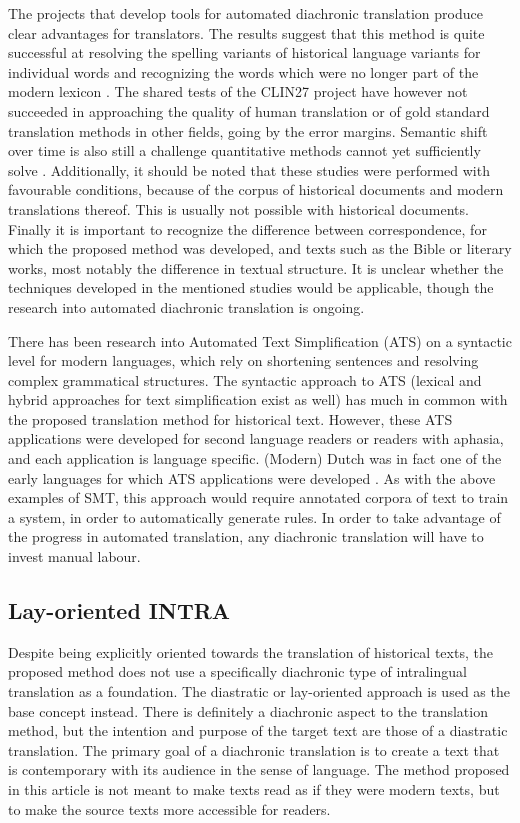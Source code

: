 \begin{paper}
The projects that develop tools for automated diachronic translation
produce clear advantages for translators. The results suggest that this
method is quite successful at resolving the spelling variants of
historical language variants for individual words and recognizing the
words which were no longer part of the modern lexicon \citep[303]{domingo_historical_2017}. The shared tests of the CLIN27 project have however not succeeded
in approaching the quality of human translation or of gold standard
translation methods in other fields, going by the error margins.
Semantic shift over time is also still a challenge quantitative methods
cannot yet sufficiently solve \citep[60]{tjong_kim_sang_clin27_2017}. Additionally,
it should be noted that these studies were performed with favourable
conditions, because of the corpus of historical documents and modern
translations thereof. This is usually not possible with historical
documents. Finally it is important to recognize the difference between
correspondence, for which the proposed method was developed, and texts
such as the Bible or literary works, most notably the difference in
textual structure. It is unclear whether the techniques developed in the
mentioned studies would be applicable, though the research into
automated diachronic translation is ongoing.

There has been research into Automated Text Simplification (ATS) on a
syntactic level for modern languages, which rely on shortening sentences
and resolving complex grammatical structures. The syntactic approach to
ATS (lexical and hybrid approaches for text simplification exist as
well) has much in common with the proposed translation method for
historical text. However, these ATS applications were developed for
second language readers or readers with aphasia, and each application is
language specific. (Modern) Dutch was in fact one of the early languages
for which ATS applications were developed \citep[63]{shardlow_survey_2014}. As with
the above examples of SMT, this approach would require annotated corpora
of text to train a system, in order to automatically generate rules. In
order to take advantage of the progress in automated translation, any
diachronic translation will have to invest manual labour.


\subsection{Lay-oriented INTRA}

Despite being explicitly oriented towards the translation of historical
texts, the proposed method does not use a specifically diachronic type
of intralingual translation as a foundation. The diastratic or
lay-oriented approach is used as the base concept instead. There is
definitely a diachronic aspect to the translation method, but the
intention and purpose of the target text are those of a diastratic
translation. The primary goal of a diachronic translation is to create a
text that is contemporary with its audience in the sense of language.
The method proposed in this article is not meant to make texts read as if they were modern
texts, but to make the source texts more accessible for readers.


\end{paper}
